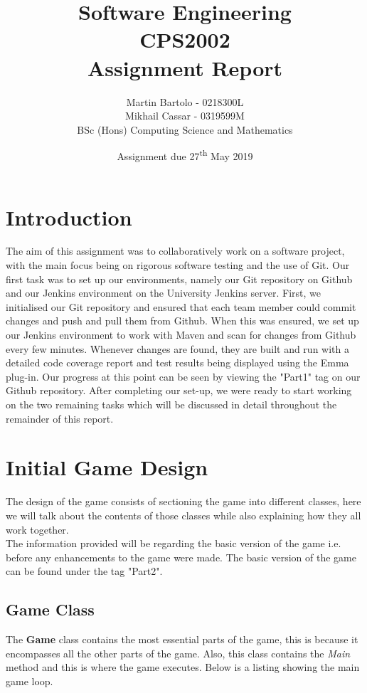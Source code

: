 \documentclass[a4paper,12pt]{extarticle}
\title{\textbf{Software Engineering\\\vspace{5mm} CPS2002\\\vspace{5mm}  Assignment Report}}
\author{\LARGE Martin Bartolo - 0218300L\vspace{1mm}\\ \LARGE Mikhail Cassar - 0319599M\vspace{3mm}\\ \large BSc (Hons) Computing Science and Mathematics}
\date{Assignment due 27\textsuperscript{th} May 2019}
\begin{document}
\setlength{\parindent}{10pt}
\setlength{\footskip}{50pt}

\maketitle
\thispagestyle{empty}
\newpage

\tableofcontents
\newpage

\section{Introduction}
The aim of this assignment was to collaboratively work on a software project, with the main focus being on rigorous software testing and the use of Git. Our first task was to set up our environments, namely our Git repository on Github and our Jenkins environment on the University Jenkins server. First, we initialised our Git repository and ensured that each team member could commit changes and push and pull them from Github. When this was ensured, we set up our Jenkins environment to work with Maven and scan for changes from Github every few minutes. Whenever changes are found, they are built and run with a detailed code coverage report and test results being displayed using the Emma plug-in. Our progress at this point can be seen by viewing the "Part1" tag on our Github repository. After completing our set-up, we were ready to start working on the two remaining tasks which will be discussed in detail throughout the remainder of this report.
\newpage

\section{Initial Game Design}
\noindent The design of the game consists of sectioning the game into different classes, here we will talk about the contents of those classes while also explaining how they all work together.\\

\noindent The information provided will be regarding the basic version of the game i.e. before any enhancements to the game were made. The basic version of the game can be found under the tag "Part2".

\subsection{Game Class}

\noindent The \textbf{Game} class contains the most essential parts of the game, this is because it encompasses all the other parts of the game. Also, this class contains the \textit{Main} method and this is where the game executes. Below is a listing showing the main game loop.
\end{document}

